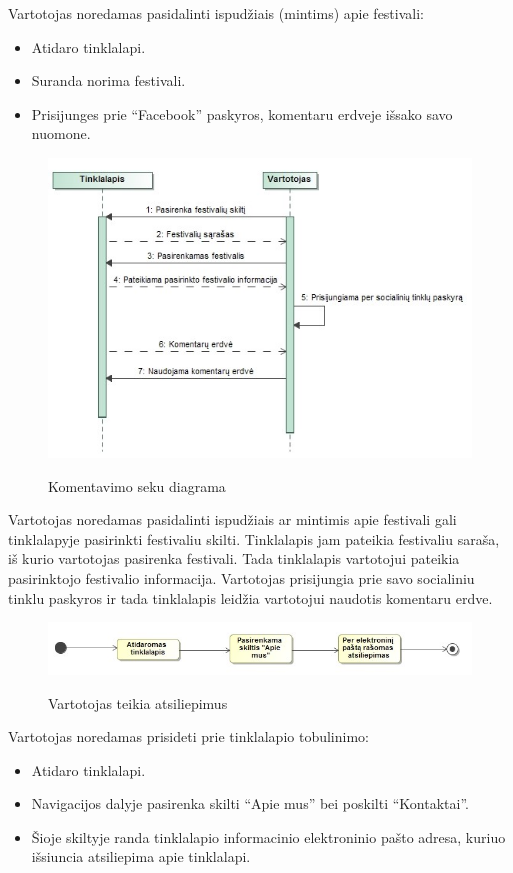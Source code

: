 ﻿\documentclass{VUMIFPSkursinis}
\begin{document}
Vartotojas noredamas pasidalinti ispudžiais (mintims) apie festivali:
\begin{itemize}
\item Atidaro tinklalapi.
\item Suranda norima festivali.
\item Prisijunges prie “Facebook” paskyros, komentaru erdveje išsako savo nuomone.
\end{itemize}
\begin{figure}[H]
    \centering
    \includegraphics[scale=0.7]{img/geri/_klientasKom}
    \label{img:uml8}
	\caption{Komentavimo seku diagrama}
\end{figure}

Vartotojas noredamas pasidalinti ispudžiais ar mintimis apie festivali gali tinklalapyje pasirinkti festivaliu skilti. Tinklalapis jam pateikia festivaliu saraša, iš kurio vartotojas pasirenka festivali. Tada tinklalapis vartotojui pateikia pasirinktojo festivalio informacija. Vartotojas prisijungia prie savo socialiniu tinklu paskyros ir tada tinklalapis leidžia vartotojui naudotis komentaru erdve.

\begin{figure}[H]
    \centering
    \includegraphics[scale=0.7]{img/geri/klientasKom}
    \label{img:uml9}
	\caption{Vartotojas teikia atsiliepimus}
\end{figure}

Vartotojas noredamas prisideti prie tinklalapio tobulinimo:
\begin{itemize}
\item Atidaro tinklalapi.
\item Navigacijos dalyje pasirenka skilti “Apie mus” bei poskilti “Kontaktai”.
\item Šioje skiltyje randa tinklalapio informacinio elektroninio pašto adresa, kuriuo išsiuncia atsiliepima apie tinklalapi.
\end{itemize}
\end{document}
